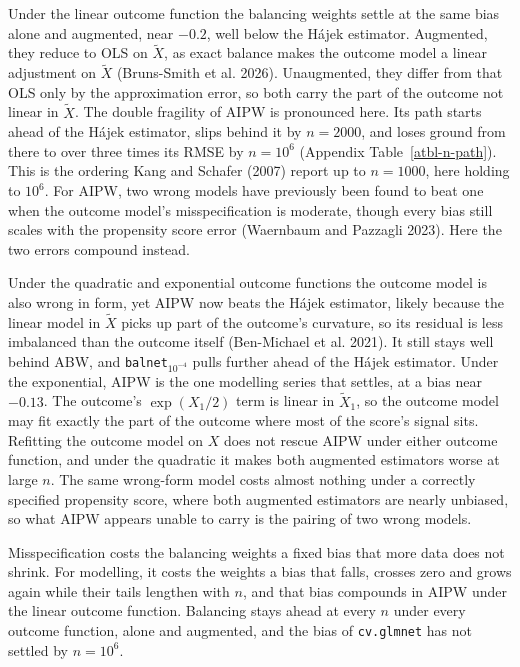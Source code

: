 \documentclass[
  12pt,
  a4paper,
]{article}
\begin{document}
Under the linear outcome function the balancing weights settle at the
same bias alone and augmented, near \(-0.2\), well below the Hájek
estimator. Augmented, they reduce to OLS on \(\tilde X\), as exact
balance makes the outcome model a linear adjustment on \(\tilde X\)
(Bruns-Smith et al. 2026). Unaugmented, they differ from that OLS only
by the approximation error, so both carry the part of the outcome not
linear in \(\tilde X\). The double fragility of AIPW is pronounced here.
Its path starts ahead of the Hájek estimator, slips behind it by
\(n = 2000\), and loses ground from there to over three times its RMSE
by \(n = 10^6\) (Appendix Table~\ref{atbl-n-path}). This is the ordering
Kang and Schafer (2007) report up to \(n = 1000\), here holding to
\(10^6\). For AIPW, two wrong models have previously been found to beat
one when the outcome model's misspecification is moderate, though every
bias still scales with the propensity score error (Waernbaum and
Pazzagli 2023). Here the two errors compound instead.

Under the quadratic and exponential outcome functions the outcome model
is also wrong in form, yet AIPW now beats the Hájek estimator, likely
because the linear model in \(\tilde X\) picks up part of the outcome's
curvature, so its residual is less imbalanced than the outcome itself
(Ben-Michael et al. 2021). It still stays well behind ABW, and
\texttt{balnet}\(_{10^{-4}}\) pulls further ahead of the Hájek
estimator. Under the exponential, AIPW is the one modelling series that
settles, at a bias near \(-0.13\). The outcome's \(\exp(X_1/2)\) term is
linear in \(\tilde X_1\), so the outcome model may fit exactly the part
of the outcome where most of the score's signal sits. Refitting the
outcome model on \(X\) does not rescue AIPW under either outcome
function, and under the quadratic it makes both augmented estimators
worse at large \(n\). The same wrong-form model costs almost nothing
under a correctly specified propensity score, where both augmented
estimators are nearly unbiased, so what AIPW appears unable to carry is
the pairing of two wrong models.

Misspecification costs the balancing weights a fixed bias that more data
does not shrink. For modelling, it costs the weights a bias that falls,
crosses zero and grows again while their tails lengthen with \(n\), and
that bias compounds in AIPW under the linear outcome function. Balancing
stays ahead at every \(n\) under every outcome function, alone and
augmented, and the bias of \texttt{cv.glmnet} has not settled by
\(n = 10^6\).
\end{document}

